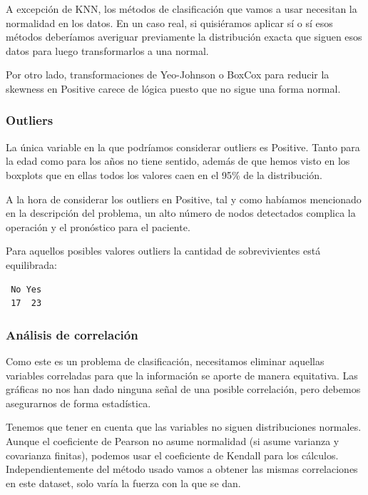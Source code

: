 A excepción de KNN, los métodos de clasificación que vamos a usar necesitan la normalidad en los datos. En un caso real, si quisiéramos aplicar sí o sí esos métodos deberíamos averiguar previamente la distribución exacta que siguen esos datos para luego transformarlos a una normal. 

\vspace{\baselineskip}

Por otro lado, transformaciones de Yeo-Johnson o BoxCox para reducir la skewness en Positive carece de lógica puesto que no sigue una forma normal.

\subsubsection{Outliers}

La única variable en la que podríamos considerar outliers es Positive. Tanto para la edad como para los años no tiene sentido, además de que hemos visto en los boxplots que en ellas todos los valores caen en el 95\% de la distribución.

A la hora de considerar los outliers en Positive, tal y como habíamos mencionado en la descripción del problema, un alto número de nodos detectados complica la operación y el pronóstico para el paciente.

Para aquellos posibles valores outliers la cantidad de sobrevivientes está equilibrada:

\begin{verbatim}
 No Yes 
 17  23 
\end{verbatim}



\subsubsection{Análisis de correlación}

Como este es un problema de clasificación, necesitamos eliminar aquellas variables correladas para que la información se aporte de manera equitativa. Las gráficas no nos han dado ninguna señal de una posible correlación, pero debemos asegurarnos de forma estadística.

Tenemos que tener en cuenta que las variables no siguen distribuciones normales. Aunque el coeficiente de Pearson no asume normalidad (si asume varianza y covarianza finitas), podemos usar el coeficiente de Kendall para los cálculos. Independientemente del método usado vamos a obtener las mismas correlaciones en este dataset, solo varía la fuerza con la que se dan.

